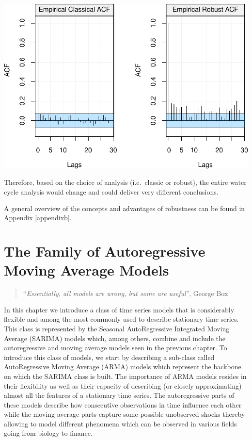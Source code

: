 \documentclass[]{book}
\theoremstyle{definition}
\theoremstyle{definition}
\theoremstyle{definition}
\theoremstyle{remark}
\begin{document}
\includegraphics{ts_files/figure-latex/unnamed-chunk-25-1.pdf}

Therefore, based on the choice of analysis (i.e.~classic or robust), the
entire water cycle analysis would change and could deliver very
different conclusions.

A general overview of the concepts and advantages of robustness can be
found in Appendix \ref{appendixb}.

\chapter{The Family of Autoregressive Moving Average
Models}\label{the-family-of-autoregressive-moving-average-models}

\begin{quote}
``\emph{Essentially, all models are wrong, but some are useful}'',
George Box
\end{quote}

In this chapter we introduce a class of time series models that is
considerably flexible and among the most commonly used to describe
stationary time series. This class is represented by the Seasonal
AutoRegressive Integrated Moving Average (SARIMA) models which, among
others, combine and include the autoregressive and moving average models
seen in the previous chapter. To introduce this class of models, we
start by describing a sub-class called AutoRegressive Moving Average
(ARMA) models which represent the backbone on which the SARIMA class is
built. The importance of ARMA models resides in their flexibility as
well as their capacity of describing (or closely approximating) almost
all the features of a stationary time series. The autoregressive parts
of these models describe how consecutive observations in time influence
each other while the moving average parts capture some possible
unobserved shocks thereby allowing to model different phenomena which
can be observed in various fields going from biology to finance.
\end{document}

